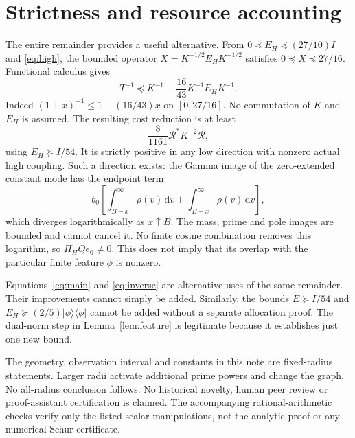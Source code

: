 \documentclass[11pt]{article}
\newcommand{\dd}{\,\mathrm d}
\newcommand{\RR}{\mathcal R}
\begin{document}
\section{Strictness and resource accounting}
The entire remainder provides a useful alternative. From $0\preceq E_H\preceq(27/10)I$ and \eqref{eq:high}, the bounded operator $X=K^{-1/2}E_HK^{-1/2}$ satisfies $0\preceq X\preceq27/16$. Functional calculus gives
\begin{equation}
 T^{-1}\preceq K^{-1}-\frac{16}{43}K^{-1}E_HK^{-1}.
 \label{eq:inverse}
\end{equation}
Indeed $(1+x)^{-1}\le1-(16/43)x$ on $[0,27/16]$. No commutation of $K$ and $E_H$ is assumed. The resulting cost reduction is at least
\[
 \frac8{1161}\RR^*K^{-2}\RR,
\]
using $E_H\succeq I/54$. It is strictly positive in any low direction with nonzero actual high coupling. Such a direction exists: the Gamma image of the zero-extended constant mode has the endpoint term
\[
 b_0\left[\int_{B-x}^\infty\rho(v)\dd v+
                \int_{B+x}^\infty\rho(v)\dd v\right],
\]
which diverges logarithmically as $x\uparrow B$. The mass, prime and pole images are bounded and cannot cancel it. No finite cosine combination removes this logarithm, so $\Pi_HQe_0\ne0$. This does not imply that its overlap with the particular finite feature $\phi$ is nonzero.

Equations~\eqref{eq:main} and \eqref{eq:inverse} are alternative uses of the same remainder. Their improvements cannot simply be added. Similarly, the bounds $E\succeq I/54$ and $E_H\succeq(2/5)|\phi\rangle\langle\phi|$ cannot be added without a separate allocation proof. The dual-norm step in Lemma~\ref{lem:feature} is legitimate because it establishes just one new bound.

The geometry, observation interval and constants in this note are fixed-radius statements. Larger radii activate additional prime powers and change the graph. No all-radius conclusion follows. No historical novelty, human peer review or proof-assistant certification is claimed. The accompanying rational-arithmetic checks verify only the listed scalar manipulations, not the analytic proof or any numerical Schur certificate.

\appendix
\end{document}
